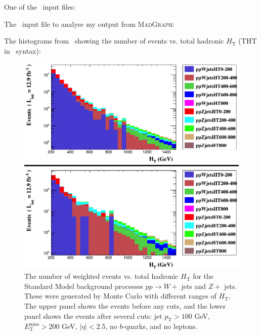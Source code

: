 One of the \madgraph\ input files:



The \madanalysis\ input file to analyse my output from \textsc{MadGraph}:



The histograms from \madanalysis\ showing the number of events vs. total hadronic $H_{\mathrm{T}}$ (THT in \madanalysis\ syntax):

\begin{figure}[H]
\centering
\includegraphics[width=\textwidth]{./sec15/HT_HTranges.png}
\caption{The number of weighted events vs. total hadronic $H_{\mathrm{T}}$ for the Standard Model background processes $pp \rightarrow W +$ jets and $Z +$ jets. These were generated by Monte Carlo with different ranges of $H_{\mathrm{T}}$. The upper panel shows the events before any cuts, and the lower panel shows the events after several cuts: jet $p_{\mathrm{T}} > 100$ GeV, $E_{\mathrm{T}}^{\mathrm{miss}} > 200$ GeV, $|\eta| < 2.5$, no $b$-quarks, and no leptons.}
\end{figure}

